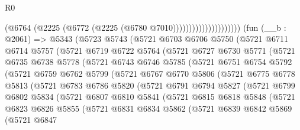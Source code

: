 \begin{lexlean}{R0}
\begin{coremodule}
                                    (@6764 (@2225 (@6772 (@2225 (@6780 @7010)))))))))))))))))))))
    (fun (__b : @2061) =>
    @5343
      (@5723
        @5743
        (@5721
          @6703
          @6706
          @5750
          (@5721
            @6711
            @6714
            @5757
            (@5721
              @6719
              @6722
              @5764
              (@5721
                @6727
                @6730
                @5771
                (@5721
                  @6735
                  @6738
                  @5778
                  (@5721
                    @6743
                    @6746
                    @5785
                    (@5721
                      @6751
                      @6754
                      @5792
                      (@5721
                        @6759
                        @6762
                        @5799
                        (@5721
                          @6767
                          @6770
                          @5806
                          (@5721
                            @6775
                            @6778
                            @5813
                            (@5721
                              @6783
                              @6786
                              @5820
                              (@5721
                                @6791
                                @6794
                                @5827
                                (@5721
                                  @6799
                                  @6802
                                  @5834
                                  (@5721
                                    @6807
                                    @6810
                                    @5841
                                    (@5721
                                      @6815
                                      @6818
                                      @5848
                                      (@5721
                                        @6823
                                        @6826
                                        @5855
                                        (@5721
                                          @6831
                                          @6834
                                          @5862
                                          (@5721
                                            @6839
                                            @6842
                                            @5869
                                            (@5721
                                              @6847

\end{coremodule}
\end{lexlean}
